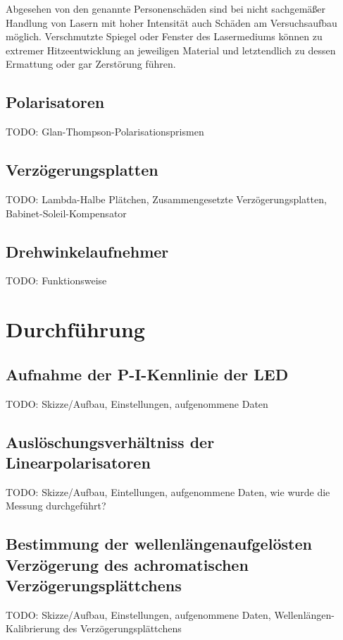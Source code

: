 \documentclass[bigchapter,colorback,accentcolor=tud4b,linedtoc,11pt]{tudreport}
\numberwithin{equation}{subsection}
\begin{document}
Abgesehen von den genannte Personenschäden sind bei nicht sachgemäßer Handlung von Lasern mit hoher Intensität auch Schäden am Versuchsaufbau möglich. Verschmutzte Spiegel oder Fenster des Lasermediums können zu extremer Hitzeentwicklung an jeweiligen Material und letztendlich zu dessen Ermattung oder gar Zerstörung führen.
\cite{GefahrenLaser}

\section{Polarisatoren}
TODO: Glan-Thompson-Polarisationsprismen

\section{Verzögerungsplatten}
TODO: Lambda-Halbe Plätchen, Zusammengesetzte Verzögerungsplatten, Babinet-Soleil-Kompensator

\section{Drehwinkelaufnehmer}
TODO: Funktionsweise

\chapter{Durchführung}
\section{Aufnahme der P-I-Kennlinie der LED}
TODO: Skizze/Aufbau, Einstellungen, aufgenommene Daten

\section{Auslöschungsverhältniss der Linearpolarisatoren}
TODO: Skizze/Aufbau, Eintellungen, aufgenommene Daten, wie wurde die Messung durchgeführt?

\section{Bestimmung der wellenlängenaufgelösten Verzögerung des achromatischen Verzögerungsplättchens}
TODO: Skizze/Aufbau, Einstellungen, aufgenommene Daten, Wellenlängen-Kalibrierung des Verzögerungsplättchens 
\end{document}
